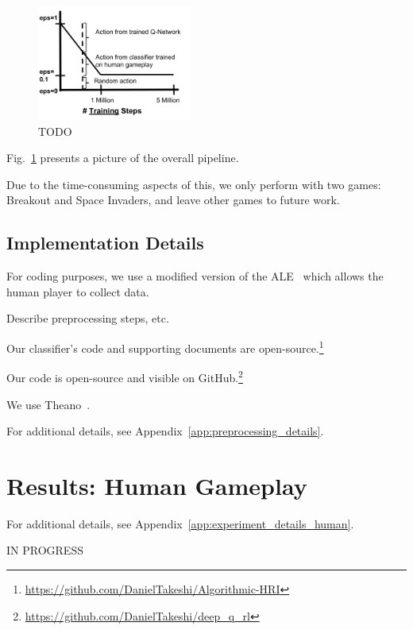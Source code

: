 \documentclass[letterpaper, 10pt, conference]{ieeeconf}
\begin{document}
\begin{figure}[t]
\centering
\includegraphics[width=0.45\textwidth]{figures/dqn_with_human_data_graph.png}
\caption{\footnotesize
TODO
}
\label{fig:human-guided-dqn}
\end{figure}

Fig.~\ref{fig:human-guided-dqn} presents a picture of the overall pipeline.

Due to the time-consuming aspects of this, we only perform with two games:
Breakout and Space Invaders, and leave other games to future work.

\subsection{Implementation Details}\label{ssec:implementation}

For coding purposes, we use a modified version of the
ALE~\cite{bellemare13arcade} which allows the human player to collect data. 

Describe preprocessing steps, etc.

Our classifier's code and supporting documents are
open-source.\footnote{\url{https://github.com/DanielTakeshi/Algorithmic-HRI}}

Our code is open-source and visible on
GitHub.\footnote{\url{https://github.com/DanielTakeshi/deep_q_rl}}

We use Theano~\cite{2016arXiv160502688short}.

For additional details, see Appendix~\ref{app:preprocessing_details}.



\section{Results: Human Gameplay}\label{sec:results_p1}

For additional details, see Appendix~\ref{app:experiment_details_human}.

IN PROGRESS
\end{document}
